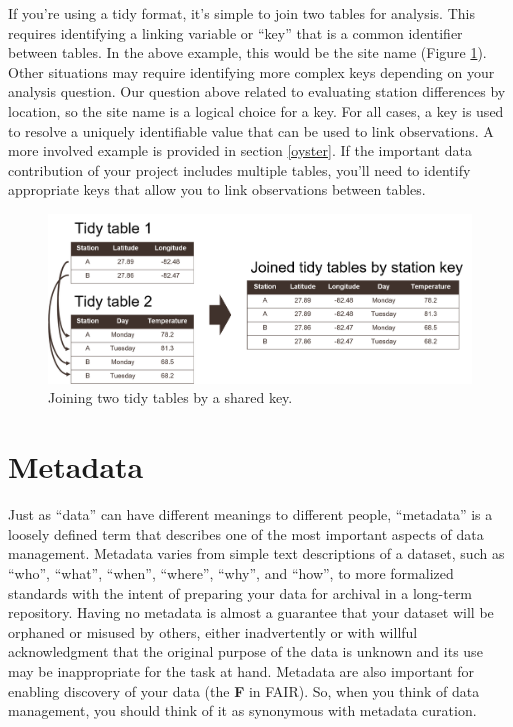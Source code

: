 \documentclass[
]{book}
\begin{document}
If you're using a tidy format, it's simple to join two tables for analysis. This requires identifying a linking variable or ``key'' that is a common identifier between tables. In the above example, this would be the site name (Figure \ref{fig:joins}). Other situations may require identifying more complex keys depending on your analysis question. Our question above related to evaluating station differences by location, so the site name is a logical choice for a key. For all cases, a key is used to resolve a uniquely identifiable value that can be used to link observations. A more involved example is provided in section \ref{oyster}. If the important data contribution of your project includes multiple tables, you'll need to identify appropriate keys that allow you to link observations between tables.

\begin{figure}

{\centering \includegraphics[width=1\linewidth]{img/joins} 

}

\caption{Joining two tidy tables by a shared key.}\label{fig:joins}
\end{figure}

\hypertarget{metadatadesc}{%
\section{Metadata}\label{metadatadesc}}

Just as ``data'' can have different meanings to different people, ``metadata'' is a loosely defined term that describes one of the most important aspects of data management. Metadata varies from simple text descriptions of a dataset, such as ``who'', ``what'', ``when'', ``where'', ``why'', and ``how'', to more formalized standards with the intent of preparing your data for archival in a long-term repository. Having no metadata is almost a guarantee that your dataset will be orphaned or misused by others, either inadvertently or with willful acknowledgment that the original purpose of the data is unknown and its use may be inappropriate for the task at hand. Metadata are also important for enabling discovery of your data (the \textbf{F} in FAIR). So, when you think of data management, you should think of it as synonymous with metadata curation.
\end{document}
